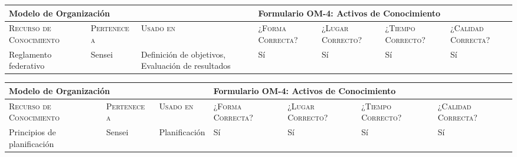 \documentclass[12pt,a4paper,twoside,spanish]{article}      %
\begin{document}
            \begin{table}[H]
                \scriptsize
                \begin{tabularx}{\textwidth}{|p{1.3cm}|p{1.3cm}|p{1.3cm}|X|X|X|X|} \hline                  
                    \multicolumn{3}{|l}{\textbf{Modelo de Organización}} & 
                    \multicolumn{4}{|l|}{\textbf{Formulario OM-4: Activos de Conocimiento}} \\ \hline\hline
                    
                    \textsc{Recurso de Conocimiento} & \textsc{Pertenece a} &  \textsc{Usado en} &  \textsc{¿Forma Correcta?} & \textsc{¿Lugar Correcto?} & \textsc{¿Tiempo Correcto?} & \textsc{¿Calidad Correcta?} \\ \hline
                    
                    Reglamento federativo & Sensei & Definición de objetivos, Evaluación de resultados & Sí & Sí & Sí & Sí \\ \hline
                    
                \end{tabularx}
                \label{tab.OM4-reglamento}
            \end{table}


            \begin{table}[H]
                \scriptsize
                \begin{tabularx}{\textwidth}{|p{1.3cm}|p{1.3cm}|p{1.3cm}|X|X|X|X|} \hline
                    \multicolumn{3}{|l}{\textbf{Modelo de Organización}} & 
                    \multicolumn{4}{|l|}{\textbf{Formulario OM-4: Activos de Conocimiento}} \\ \hline\hline
                    
                    \textsc{Recurso de Conocimiento} & \textsc{Pertenece a} &  \textsc{Usado en} &  \textsc{¿Forma Correcta?} & \textsc{¿Lugar Correcto?} & \textsc{¿Tiempo Correcto?} & \textsc{¿Calidad Correcta?} \\ \hline
                    
                    Principios de planificación & Sensei & Planificación & Sí & Sí & Sí & Sí \\ \hline
                    
                \end{tabularx}
                \label{tab.OM4-heuristicas}
            \end{table}
\end{document}
